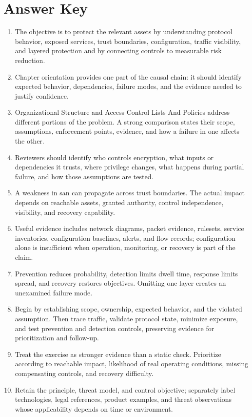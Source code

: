 \documentclass[11pt]{article}
\begin{document}
\section*{Answer Key}
\begin{enumerate}
\item The objective is to protect the relevant assets by understanding protocol behavior, exposed services, trust boundaries, configuration, traffic visibility, and layered protection and by connecting controls to measurable risk reduction.
\item Chapter orientation provides one part of the causal chain: it should identify expected behavior, dependencies, failure modes, and the evidence needed to justify confidence.
\item Organizational Structure and Access Control Lists And Policies address different portions of the problem. A strong comparison states their scope, assumptions, enforcement points, evidence, and how a failure in one affects the other.
\item Reviewers should identify who controls encryption, what inputs or dependencies it trusts, where privilege changes, what happens during partial failure, and how those assumptions are tested.
\item A weakness in san can propagate across trust boundaries. The actual impact depends on reachable assets, granted authority, control independence, visibility, and recovery capability.
\item Useful evidence includes network diagrams, packet evidence, rulesets, service inventories, configuration baselines, alerts, and flow records; configuration alone is insufficient when operation, monitoring, or recovery is part of the claim.
\item Prevention reduces probability, detection limits dwell time, response limits spread, and recovery restores objectives. Omitting one layer creates an unexamined failure mode.
\item Begin by establishing scope, ownership, expected behavior, and the violated assumption. Then trace traffic, validate protocol state, minimize exposure, and test prevention and detection controls, preserving evidence for prioritization and follow-up.
\item Treat the exercise as stronger evidence than a static check. Prioritize according to reachable impact, likelihood of real operating conditions, missing compensating controls, and recovery difficulty.
\item Retain the principle, threat model, and control objective; separately label technologies, legal references, product examples, and threat observations whose applicability depends on time or environment.
\end{enumerate}
\end{document}
